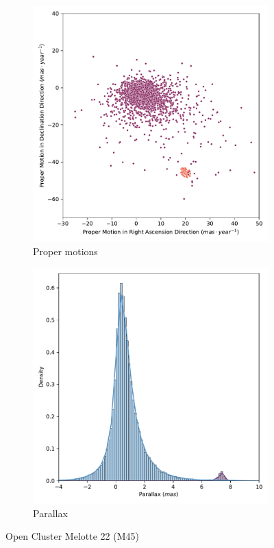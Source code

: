 \documentclass[11pt, a4paper, english]{book}
\begin{document}
\begin{figure}[htbp]
  \centering
  \begin{subfigure}[t]{0.45\textwidth}
    \centering
    \includegraphics[width=\textwidth]{../figures/pm_melotte_22.pdf}
    \caption{Proper motions}
    \label{fig:pm_melotte_22}
  \end{subfigure}
  \hfill
  \begin{subfigure}[t]{0.45\textwidth}
    \centering
    \includegraphics[width=\textwidth]{../figures/parallax_melotte_22.pdf}
    \caption{Parallax}
    \label{fig:pm_vec_melotte_22}
  \end{subfigure}
  \caption{Open Cluster Melotte 22 (M45)}
\end{figure}
\end{document}

